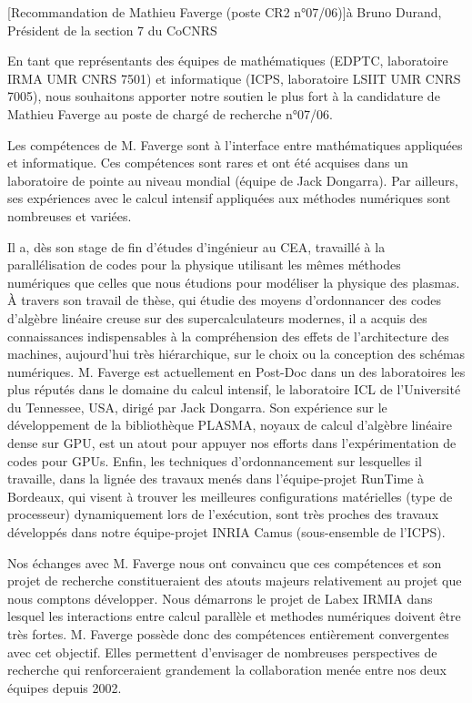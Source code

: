 \documentclass[a4paper,10pt]{article}
\begin{document}

\begin{letter}[Recommandation de Mathieu Faverge (poste CR2 n°07/06)]{à}
		  {Bruno Durand, \\Président de la section 7 du CoCNRS}

En tant que représentants des équipes de mathématiques (EDPTC, 
laboratoire IRMA UMR CNRS 7501) et informatique (ICPS, laboratoire 
LSIIT UMR CNRS 7005), nous souhaitons apporter notre soutien le plus
fort à la candidature de Mathieu Faverge au poste de chargé de recherche 
n°07/06.   

Les compétences de M. Faverge sont à l'interface entre mathématiques
appliquées et informatique. Ces compétences sont rares et ont été 
acquises dans un laboratoire de pointe au niveau mondial (équipe de 
Jack Dongarra). Par ailleurs, ses expériences avec le calcul intensif 
appliquées aux méthodes numériques sont nombreuses et variées. 

Il a, dès son stage de fin d'études d'ingénieur au CEA, travaillé à la 
parallélisation de codes pour la physique utilisant les mêmes méthodes 
numériques que celles que nous étudions pour modéliser la physique des 
plasmas. \`A travers son travail de thèse, qui étudie des moyens 
d'ordonnancer des codes d'algèbre linéaire creuse sur des supercalculateurs
modernes, il a acquis des connaissances indispensables à la compréhension
des effets de l'architecture des machines, aujourd'hui très hiérarchique,
sur le choix ou la conception des schémas numériques. M. Faverge est
actuellement en Post-Doc dans un des laboratoires les plus réputés
dans le domaine du calcul intensif, le laboratoire ICL de l'Université 
du Tennessee, USA, dirigé par Jack Dongarra. Son expérience sur le développement
de la bibliothèque PLASMA, noyaux de calcul d'algèbre linéaire dense
sur GPU, est un atout pour appuyer nos efforts dans l'expérimentation
de codes pour GPUs. Enfin, les techniques d'ordonnancement sur lesquelles
il travaille, dans la lignée des travaux menés dans l'équipe-projet
RunTime à Bordeaux, qui visent à trouver les meilleures configurations
matérielles (type de processeur) dynamiquement lors de l'exécution,
sont très proches des travaux développés dans notre équipe-projet 
INRIA Camus (sous-ensemble de l'ICPS).


Nos échanges avec M. Faverge nous ont convaincu que ces compétences et 
son projet de recherche constitueraient des atouts majeurs relativement 
au projet que nous comptons développer. Nous démarrons le projet de
Labex IRMIA dans lesquel les interactions entre calcul parallèle et 
methodes numériques doivent être très fortes.  M. Faverge possède donc 
des compétences entièrement convergentes avec cet objectif. Elles  %
permettent d'envisager de nombreuses perspectives de recherche qui 
renforceraient grandement la collaboration menée entre nos deux équipes 
depuis 2002.


\end{letter}
\end{document}
